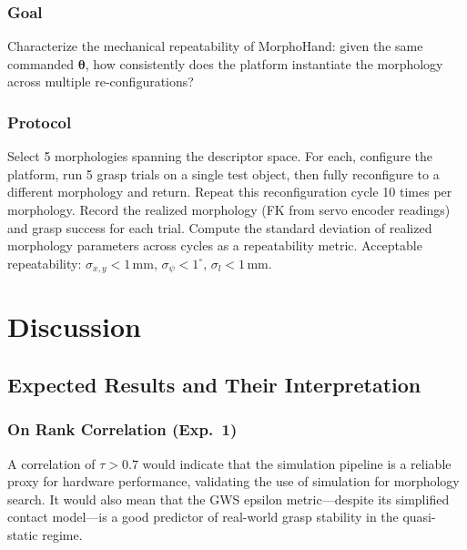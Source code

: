 \documentclass[journal]{IEEEtran}
\newcommand{\btheta}{\boldsymbol{\theta}}
\begin{document}
\subsubsection{Goal}
Characterize the mechanical repeatability of MorphoHand: given the same commanded $\btheta$,
how consistently does the platform instantiate the morphology across multiple re-configurations?

\subsubsection{Protocol}
Select 5 morphologies spanning the descriptor space.
For each, configure the platform, run 5 grasp trials on a single test object, then
fully reconfigure to a different morphology and return.
Repeat this reconfiguration cycle 10 times per morphology.
Record the realized morphology (FK from servo encoder readings) and grasp success for
each trial.
Compute the standard deviation of realized morphology parameters across cycles as a
repeatability metric.
Acceptable repeatability: $\sigma_{x,y} < 1$\,mm, $\sigma_\psi < 1^\circ$,
$\sigma_l < 1$\,mm.

\section{Discussion}
\label{sec:discussion}

\subsection{Expected Results and Their Interpretation}

\subsubsection{On Rank Correlation (Exp.\ 1)}

A correlation of $\tau > 0.7$ would indicate that the simulation pipeline is a reliable
proxy for hardware performance, validating the use of simulation for morphology search.
It would also mean that the GWS epsilon metric---despite its simplified contact model---is
a good predictor of real-world grasp stability in the quasi-static regime.
\end{document}
